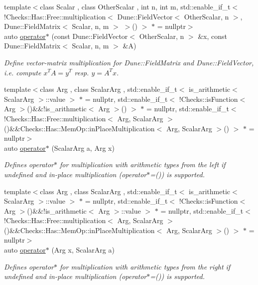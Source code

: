 \begin{DoxyCompactItemize}
{\footnotesize template$<$class Scalar , class Other\+Scalar , int n, int m, std\+::enable\+\_\+if\+\_\+t$<$ !\+Checks\+::\+Has\+::\+Free\+::multiplication$<$ Dune\+::\+Field\+Vector$<$ Other\+Scalar, n $>$, Dune\+::\+Field\+Matrix$<$ Scalar, n, m $>$ $>$() $>$ $\ast$  = nullptr$>$ }\\auto \hyperlink{namespaceFunG_a19a9d7b55b56f5101560034413a1dbfe}{operator$\ast$} (const Dune\+::\+Field\+Vector$<$ Other\+Scalar, n $>$ \&x, const Dune\+::\+Field\+Matrix$<$ Scalar, n, m $>$ \&A)
\begin{DoxyCompactList}\small\item\em Define vector-\/matrix multiplication for Dune\+::\+Field\+Matrix and Dune\+::\+Field\+Vector, i.\+e. compute $x^T A = y^T$ resp. $y=A^T x$. \end{DoxyCompactList}\item 
{\footnotesize template$<$class Arg , class Scalar\+Arg , std\+::enable\+\_\+if\+\_\+t$<$ is\+\_\+arithmetic$<$ Scalar\+Arg $>$\+::value $>$ $\ast$  = nullptr, std\+::enable\+\_\+if\+\_\+t$<$ !\+Checks\+::is\+Function$<$ Arg $>$()\&\&!is\+\_\+arithmetic$<$ Arg $>$() $>$ $\ast$  = nullptr, std\+::enable\+\_\+if\+\_\+t$<$ !\+Checks\+::\+Has\+::\+Free\+::multiplication$<$ Arg, Scalar\+Arg $>$()\&\&\+Checks\+::\+Has\+::\+Mem\+Op\+::in\+Place\+Multiplication$<$ Arg, Scalar\+Arg $>$() $>$ $\ast$  = nullptr$>$ }\\auto \hyperlink{namespaceFunG_a9b303ce8718a6f64b035e7e782370734}{operator$\ast$} (Scalar\+Arg a, Arg x)
\begin{DoxyCompactList}\small\item\em Defines operator$\ast$ for multiplication with arithmetic types from the left if undefined and in-\/place multiplication (operator$\ast$=()) is supported. \end{DoxyCompactList}\item 
{\footnotesize template$<$class Arg , class Scalar\+Arg , std\+::enable\+\_\+if\+\_\+t$<$ is\+\_\+arithmetic$<$ Scalar\+Arg $>$\+::value $>$ $\ast$  = nullptr, std\+::enable\+\_\+if\+\_\+t$<$ !\+Checks\+::is\+Function$<$ Arg $>$()\&\&!is\+\_\+arithmetic$<$ Arg $>$\+::value $>$ $\ast$  = nullptr, std\+::enable\+\_\+if\+\_\+t$<$ !\+Checks\+::\+Has\+::\+Free\+::multiplication$<$ Arg, Scalar\+Arg $>$()\&\&\+Checks\+::\+Has\+::\+Mem\+Op\+::in\+Place\+Multiplication$<$ Arg, Scalar\+Arg $>$() $>$ $\ast$  = nullptr$>$ }\\auto \hyperlink{namespaceFunG_a3cd5a2cb1abba842154691bb84aab896}{operator$\ast$} (Arg x, Scalar\+Arg a)
\begin{DoxyCompactList}\small\item\em Defines operator$\ast$ for multiplication with arithmetic types from the right if undefined and in-\/place multiplication (operator$\ast$=()) is supported. \end{DoxyCompactList}\item 

\end{DoxyCompactItemize}
